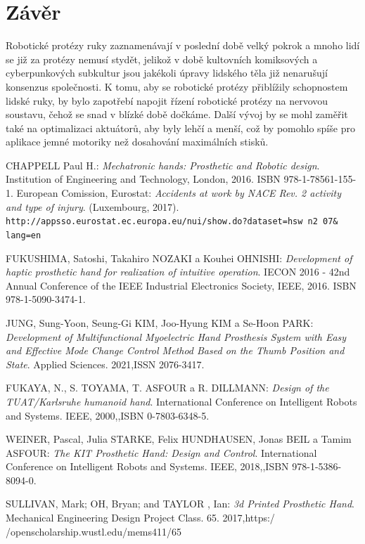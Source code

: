 \documentclass[a4paper,12pt]{article}
\begin{document}
\section{Závěr}
Robotické protézy ruky zaznamenávají v poslední době velký pokrok a mnoho lidí se již za protézy nemusí stydět, jelikož v době kultovních komiksových a cyberpunkových subkultur jsou jakékoli úpravy lidského těla již nenarušují konsenzus společnosti. K tomu, aby se robotické protézy přiblížily schopnostem lidské ruky, by bylo zapotřebí napojit řízení robotické protézy  na nervovou soustavu, čehož se snad v blízké době dočkáme. Další vývoj by se mohl zaměřit také na optimalizaci aktuátorů, aby byly lehčí a menší, což by pomohlo spíše pro aplikace jemné motoriky než dosahování maximálních stisků.
\pagebreak
\begin{thebibliography}{1}
   CHAPPELL  Paul H.:
    \emph{Mechatronic hands: Prosthetic and Robotic design}. Institution of Engineering and Technology,
    London, 2016. ISBN 978-1-78561-155-1.
   European Comission, Eurostat:
    \emph{Accidents at work by NACE Rev. 2 activity and type of injury}. (Luxembourg, 2017).\\
    \verb|http://appsso.eurostat.ec.europa.eu/nui/show.do?dataset=hsw n2 07& lang=en|
    
   FUKUSHIMA, Satoshi, Takahiro NOZAKI a Kouhei OHNISHI:
    \emph{Development of haptic prosthetic hand for realization of intuitive operation}. IECON 2016 - 42nd Annual Conference of the IEEE Industrial Electronics Society,
    IEEE, 2016. ISBN 978-1-5090-3474-1.
    
   JUNG, Sung-Yoon, Seung-Gi KIM, Joo-Hyung KIM a Se-Hoon PARK:
    \emph{Development of Multifunctional Myoelectric Hand Prosthesis System with Easy and Effective Mode Change Control Method Based on the Thumb Position and State}. Applied Sciences. 2021,ISSN 2076-3417.  
    
     FUKAYA, N., S. TOYAMA, T. ASFOUR a R. DILLMANN:
    \emph{Design of the TUAT/Karlsruhe humanoid hand}. International Conference on Intelligent Robots and Systems.  IEEE, 2000,,ISBN 0-7803-6348-5. 
    
     WEINER, Pascal, Julia STARKE, Felix HUNDHAUSEN, Jonas BEIL a Tamim ASFOUR:
    \emph{The KIT Prosthetic Hand: Design and Control}. International Conference on Intelligent Robots and Systems.  IEEE, 2018,,ISBN 978-1-5386-8094-0.
    
      SULLIVAN, Mark; OH, Bryan; and TAYLOR , Ian:
    \emph{3d Printed Prosthetic Hand}. Mechanical Engineering 
Design Project Class. 65.  2017,https:/ /openscholarship.wustl.edu/mems411/65 
    

\end{thebibliography}
\end{document}
